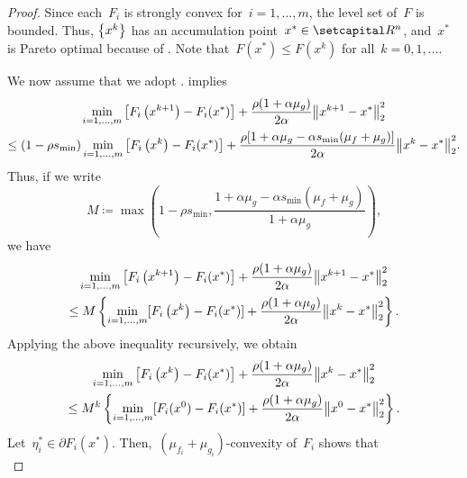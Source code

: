 \documentclass[../../main]{subfiles}
\begin{document}
\begin{proof}
    Since each~$F_i$ is strongly convex for~$i = 1, \dots, m$, the level set of~$F$ is bounded.
    Thus, $\set*{x^k}$ has an accumulation point~$x^* \in \setR^n$, and~$x^*$ is Pareto optimal because of .
    Note that~$F(x^*) \le F\left(x^k\right)$ for all~$k = 0, 1, \dots$.

    We now assume that we adopt .
     implies
    \begin{multline}
        \min_{i = 1, \dots, m} \left[F_i\left(x^{k + 1}\right) - F_i(x^*)\right] + \frac{\rho (1 + \alpha \mu_g)}{2 \alpha} \norm*{x^{k + 1} - x^*}_2^2 \\
        \le (1 - \rho s_{\min}) \min_{i = 1, \dots, m} \left[F_i\left(x^k\right) - F_i(x^*)\right] + \frac{\rho [1 + \alpha \mu_g - \alpha s_{\min} (\mu_f + \mu_g)]}{2 \alpha} \norm*{x^k - x^*}_2^2
        .\end{multline}
    Thus, if we write
    \begin{equation}
        M \coloneqq \max \left( 1 - \rho s_{\min}, \frac{1 + \alpha \mu_g - \alpha s_{\min} (\mu_f + \mu_g)}{1 + \alpha \mu_g} \right)
        ,\end{equation}
    we have
    \begin{multline}
        \min_{i = 1, \dots, m} \left[F_i\left(x^{k + 1}\right) - F_i(x^*)\right] + \frac{\rho (1 + \alpha \mu_g)}{2 \alpha} \norm*{x^{k + 1} - x^*}_2^2 \\
        \le M \left\{ \min_{i = 1, \dots, m} [F_i\left(x^k\right) - F_i(x^*)] + \frac{\rho (1 + \alpha \mu_g)}{2 \alpha} \norm*{x^k - x^*}_2^2 \right\}
        .\end{multline}
    Applying the above inequality recursively, we obtain
    \begin{multline} \label{eq:pgm_linear_convergence_sc:rec}
        \min_{i = 1, \dots, m} \left[F_i\left(x^k\right) - F_i(x^*)\right] + \frac{\rho (1 + \alpha \mu_g)}{2 \alpha} \norm*{x^k - x^*}_2^2 \\
        \le M^k \left\{ \min_{i = 1, \dots, m} [F_i(x^0) - F_i(x^*)] + \frac{\rho (1 + \alpha \mu_g)}{2 \alpha} \norm*{x^0 - x^*}_2^2 \right\}
        .\end{multline}
    Let~$\eta_i^* \in \partial F_i(x^*)$.
    Then,~$(\mu_{f_i} + \mu_{g_i})$-convexity of~$F_i$ shows that
    \begin{equation} \label{eq:pgm_linear_convergence_sc:sc}

\end{equation}
\end{proof}
\end{document}
